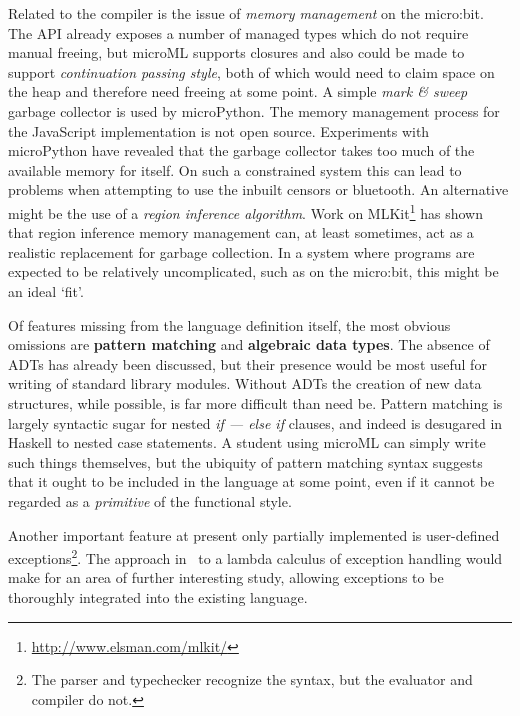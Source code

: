 \documentclass[12pt, a4paper]{report}
\begin{document}
Related to the compiler is the issue of \textit{memory management} on the micro:bit. The API already
exposes a number of managed types which do not require manual freeing, but microML supports closures
and also could be made to support \textit{continuation passing style}, both of which would need to
claim space on the heap and therefore need freeing at some point. A simple \textit{mark \& sweep}
garbage collector is used by microPython. The memory management process for the JavaScript
implementation is not open source. Experiments with microPython have revealed that the garbage
collector takes too much of the available memory for itself. On such a constrained system this can
lead to problems when attempting to use the inbuilt censors or bluetooth. An alternative might be
the use of a \textit{region inference algorithm}\cite{Tofte:1998:RIA:291891.291894}. Work on
MLKit\footnote{\url{http://www.elsman.com/mlkit/}} has shown that region inference memory management
can, at least sometimes, act as a realistic replacement for garbage collection. In a system where
programs are expected to be relatively uncomplicated, such as on the micro:bit, this might be an
ideal `fit'.

Of features missing from the language definition itself, the most obvious omissions are
\textbf{pattern matching} and \textbf{algebraic data types}. The absence of ADTs has already been
discussed, but their presence would be most useful for writing of standard library modules. Without
ADTs the creation of new data structures, while possible, is far more difficult than need be.
Pattern matching is largely syntactic sugar for nested \textit{if --- else if} clauses, and indeed
is desugared in Haskell to nested case statements. A student using microML can simply write such
things themselves, but the ubiquity of pattern matching syntax suggests that it ought to be included
in the language at some point, even if it cannot be regarded as a \textit{primitive} of the
functional style. 

Another important feature at present only partially implemented is user-defined
exceptions\footnote{The parser and typechecker recognize the syntax, but the evaluator and compiler
do not.}. The approach in~\cite{deGroote1995} to a lambda calculus of exception handling would make
for an area of further interesting study, allowing exceptions to be thoroughly integrated into the
existing language.
\end{document}
